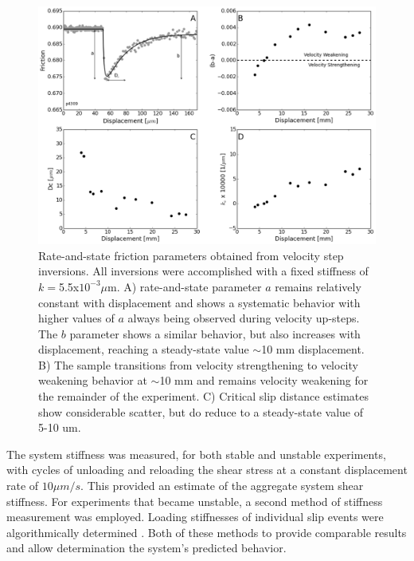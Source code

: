 \documentclass[11pt]{article}
\begin{document}
\begin{figure}
    \centering
        \includegraphics[scale=0.45]{../Figures/Fig_RSF_Parameters/RSF_Parameters.png}
       \caption{Rate-and-state friction parameters obtained from velocity step
       inversions. All inversions were accomplished with a fixed stiffness of
       $k=$5.5x$10 ^ {-3} \mu$m. A) rate-and-state parameter $a$ remains relatively
       constant with displacement and shows a systematic behavior with higher
       values of $a$ always being observed during velocity up-steps. The $b$
       parameter shows a similar behavior, but also increases with displacement,
       reaching a steady-state value $\sim$10 mm displacement. B) The sample
       transitions from velocity strengthening to velocity weakening  behavior
       at $\sim$10 mm and remains velocity weakening for the remainder of  the
       experiment. C) Critical slip distance estimates show considerable
       scatter,  but do reduce to a steady-state value of 5-10 um.}
      \label{Figure:RSF Props}
\end{figure}

The system stiffness was measured, for both stable and unstable experiments,
with cycles of unloading and reloading the shear stress at a constant
displacement rate of $10 \mu m/s$.  This provided an estimate of the aggregate
system shear stiffness. For experiments that became unstable, a second method of
stiffness measurement was employed. Loading stiffnesses of individual slip
events were algorithmically determined \cite{Leeman:2015}. Both of
these methods to provide comparable results and allow determination the system's
predicted behavior.
\end{document}

